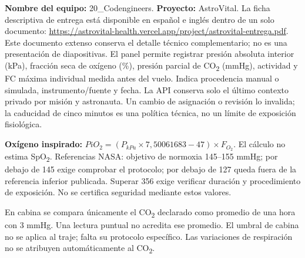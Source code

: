 \newpage
{}
\textbf{Nombre del equipo:} 20\_Codengineers. \textbf{Proyecto:} AstroVital.
La ficha descriptiva de entrega está disponible en español e inglés dentro de un solo documento: \url{https://astrovital-health.vercel.app/project/astrovital-entrega.pdf}. Este documento extenso conserva el detalle técnico complementario; no es una presentación de diapositivas.
El panel permite registrar presión absoluta interior (kPa), fracción seca de oxígeno (\%), presión parcial de CO\textsubscript{2} (mmHg), actividad y FC máxima individual medida antes del vuelo. Indica procedencia manual o simulada, instrumento/fuente y fecha. La API conserva solo el último contexto privado por misión y astronauta. Un cambio de asignación o revisión lo invalida; la caducidad de cinco minutos es una política técnica, no un límite de exposición fisiológica.
\begin{infobox}
\textbf{Oxígeno inspirado:} $PiO_2=(P_{kPa}\times7{,}50061683-47)\times F_{O_2}$. El cálculo no estima SpO\textsubscript{2}. Referencias NASA: objetivo de normoxia 145--155 mmHg; por debajo de 145 exige comprobar el protocolo; por debajo de 127 queda fuera de la referencia inferior publicada. Superar 356 exige verificar duración y procedimiento de exposición. No se certifica seguridad mediante estos valores.
\end{infobox}
En cabina se compara únicamente el CO\textsubscript{2} declarado como promedio de una hora con 3 mmHg. Una lectura puntual no acredita ese promedio. El umbral de cabina no se aplica al traje; falta su protocolo específico. Las variaciones de respiración no se atribuyen automáticamente al CO\textsubscript{2}.

